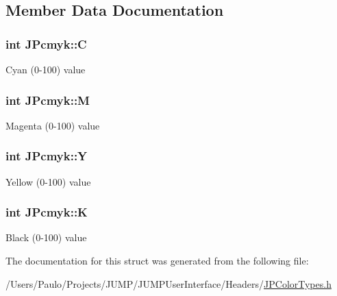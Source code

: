 \subsection{Member Data Documentation}
\hypertarget{struct_j_pcmyk_a31b198bd6e353092dc4ca5fd489baf29}{
\subsubsection[{C}]{\setlength{\rightskip}{0pt plus 5cm}int {\bf JPcmyk::C}}}
\label{struct_j_pcmyk_a31b198bd6e353092dc4ca5fd489baf29}
Cyan (0-\/100) value \hypertarget{struct_j_pcmyk_a90de4545615a3622b5ea4f83d3ca3479}{
\subsubsection[{M}]{\setlength{\rightskip}{0pt plus 5cm}int {\bf JPcmyk::M}}}
\label{struct_j_pcmyk_a90de4545615a3622b5ea4f83d3ca3479}
Magenta (0-\/100) value \hypertarget{struct_j_pcmyk_a54bb8ef1c6b8d49f5aed98f5ad9e3053}{
\subsubsection[{Y}]{\setlength{\rightskip}{0pt plus 5cm}int {\bf JPcmyk::Y}}}
\label{struct_j_pcmyk_a54bb8ef1c6b8d49f5aed98f5ad9e3053}
Yellow (0-\/100) value \hypertarget{struct_j_pcmyk_aaae615286949bac30609a3a29a20e5fb}{
\subsubsection[{K}]{\setlength{\rightskip}{0pt plus 5cm}int {\bf JPcmyk::K}}}
\label{struct_j_pcmyk_aaae615286949bac30609a3a29a20e5fb}
Black (0-\/100) value 

The documentation for this struct was generated from the following file:\begin{DoxyCompactItemize}
\item 
/Users/Paulo/Projects/JUMP/JUMPUserInterface/Headers/\hyperlink{_j_p_color_types_8h}{JPColorTypes.h}\end{DoxyCompactItemize}
